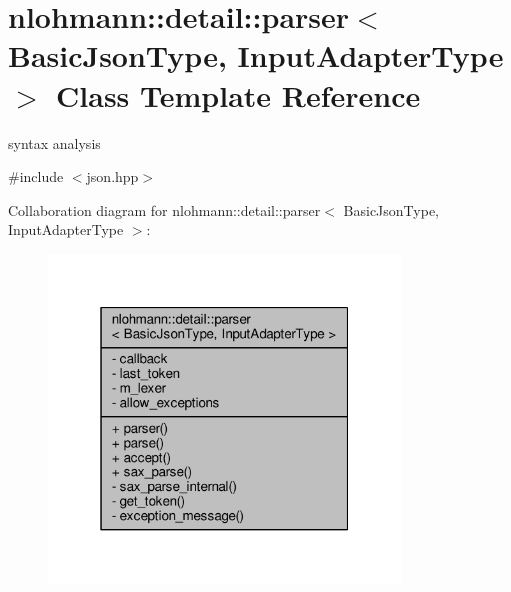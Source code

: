 \hypertarget{classnlohmann_1_1detail_1_1parser}{}\section{nlohmann\+:\+:detail\+:\+:parser$<$ Basic\+Json\+Type, Input\+Adapter\+Type $>$ Class Template Reference}
\label{classnlohmann_1_1detail_1_1parser}


syntax analysis  




{\ttfamily \#include $<$json.\+hpp$>$}



Collaboration diagram for nlohmann\+:\+:detail\+:\+:parser$<$ Basic\+Json\+Type, Input\+Adapter\+Type $>$\+:
\nopagebreak
\begin{figure}[H]
\begin{center}
\leavevmode
\includegraphics[width=265pt]{classnlohmann_1_1detail_1_1parser__coll__graph}
\end{center}
\end{figure}
